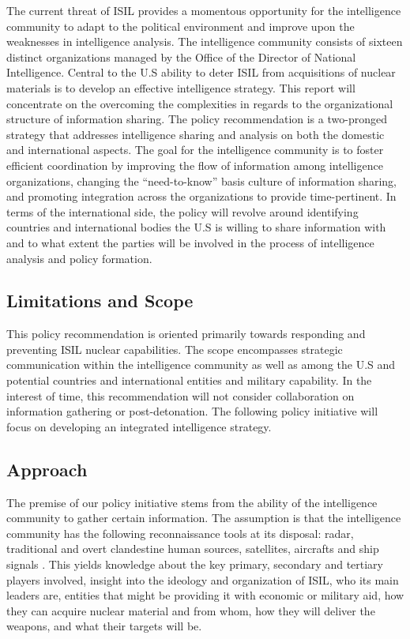 \documentclass{report}
\begin{document}
The current threat of ISIL provides a momentous opportunity for the intelligence community to adapt to the political environment and improve upon the weaknesses in intelligence analysis. The intelligence community consists of sixteen distinct organizations managed by the Office of the Director of National Intelligence. Central to the U.S ability to deter ISIL from acquisitions of nuclear materials is to develop an effective intelligence strategy. This report will concentrate on the overcoming the complexities in regards to the organizational structure of information sharing. The policy recommendation is a two-pronged strategy that addresses intelligence sharing and analysis on both the  domestic and international aspects. The goal for the intelligence community is to foster efficient coordination by improving the flow of information among intelligence organizations, changing the \enquote{need-to-know} basis culture of information sharing, and promoting integration across the organizations to provide time-pertinent. In terms of the international side, the policy will revolve around identifying countries and international bodies the U.S is willing to share information with and to what extent the parties will be involved in the process of intelligence analysis and policy formation.


\subsection{Limitations and Scope}

This policy recommendation is oriented primarily towards responding and preventing ISIL nuclear capabilities. The scope encompasses strategic communication within the intelligence community as well as among the U.S and potential countries and international entities and military capability. In the interest of time, this recommendation will not consider collaboration on information gathering or post-detonation. The following policy initiative will focus on developing an integrated intelligence strategy. 

\subsection{Approach}

The premise of our policy initiative stems from the ability of the intelligence community to gather certain information. The assumption is that the intelligence community has the following reconnaissance tools at its disposal: radar, traditional and overt clandestine human sources, satellites, aircrafts and ship signals \cite{Richelson2011}. This yields knowledge about the key primary, secondary and tertiary players involved, insight into the ideology and organization of ISIL, who its main leaders are, entities that might be providing it with economic or military aid, how they can acquire nuclear material and from whom, how they will deliver the weapons, and what their targets will be. 
\end{document}
